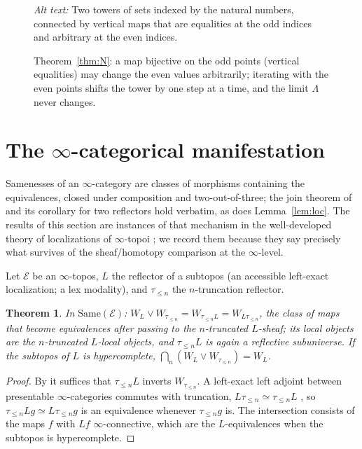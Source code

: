 \documentclass[11pt]{amsart}
\newtheorem{thm}{Theorem}[section]
\theoremstyle{definition}
\newcommand{\Same}{\mathrm{Same}}
\begin{document}
\begin{figure}[ht]
\centering
{}
\caption{Theorem~\ref{thm:N}: a map bijective on the odd points (vertical
equalities) may change the even values arbitrarily; iterating with the even
points shifts the tower by one step at a time, and the limit $\Lambda$ never
changes.}
\label{fig:N}
\par\smallskip\noindent\textit{Alt text:} Two towers of sets indexed by the
natural numbers, connected by vertical maps that are equalities at the odd
indices and arbitrary at the even indices.
\end{figure}

\section{The $\infty$-categorical manifestation}\label{sec:infty}

Samenesses of an $\infty$-category are classes of morphisms containing the
equivalences, closed under composition and two-out-of-three; the join theorem
of \cite[Thm.~4.1]{Postnikov} and its corollary for two reflectors hold
verbatim, as does Lemma~\ref{lem:loc}. The results of this section are
instances of that mechanism in the well-developed theory of localizations
of $\infty$-topoi \cite{HTT}; we record them because they say precisely what
survives of the sheaf/homotopy comparison at the $\infty$-level.

Let $\mathcal E$ be an $\infty$-topos, $L$ the reflector of a subtopos (an
accessible left-exact localization; a lex modality), and $\tau_{\le n}$ the
$n$-truncation reflector.

\begin{thm}\label{thm:infty}
In $\Same(\mathcal E)$: $W_L\vee W_{\tau_{\le n}}=W_{\tau_{\le n}L}=W_{L\tau_{\le n}}$,
the class of maps that become equivalences after passing to the
$n$-truncated $L$-sheaf; its local objects are the $n$-truncated $L$-local
objects, and $\tau_{\le n}L$ is again a reflective subuniverse. If the subtopos
of $L$ is hypercomplete, $\bigcap_n(W_L\vee W_{\tau_{\le n}})=W_L$.
\end{thm}
\begin{proof}
By \cite[Cor.~4.2]{Postnikov} it suffices that $\tau_{\le n}L$ inverts
$W_{\tau_{\le n}}$. A left-exact left adjoint between presentable
$\infty$-categories commutes with truncation, $L\tau_{\le n}\simeq\tau_{\le n}L$
\cite[5.5.6.28]{HTT}, so $\tau_{\le n}Lg\simeq L\tau_{\le n}g$ is an equivalence
whenever $\tau_{\le n}g$ is. The intersection consists of the maps $f$ with
$Lf$ $\infty$-connective, which are the $L$-equivalences when the subtopos is
hypercomplete.
\end{proof}
\end{document}
